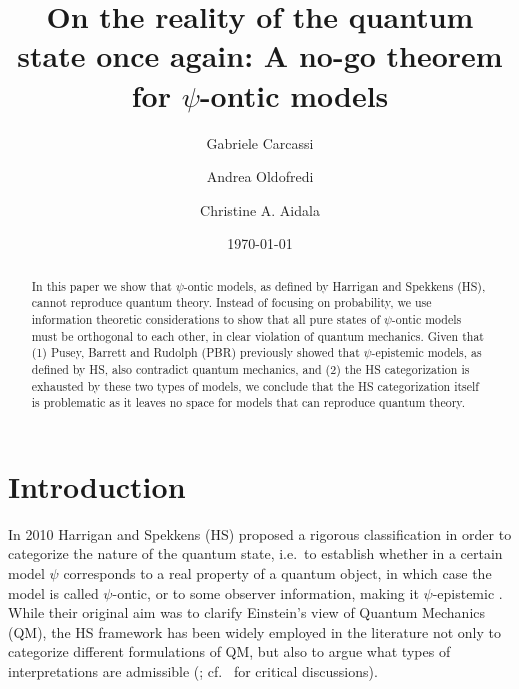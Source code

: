 \documentclass[10pt,twocolumn, nofootinbib]{revtex4-2}
\begin{document}
\title{On the reality of the quantum state once again: A no-go theorem for $\psi$-ontic models}
\author{Gabriele Carcassi}
\author{Andrea Oldofredi}
\author{Christine A. Aidala}
\vspace{2mm}

\date{\today}


\begin{abstract}
	In this paper we show that $\psi$-ontic models, as defined by Harrigan and Spekkens (HS), cannot reproduce quantum theory. Instead of focusing on probability, we use information theoretic considerations to show that all pure states of $\psi$-ontic models must be orthogonal to each other, in clear violation of quantum mechanics. Given that  (1) Pusey, Barrett and Rudolph (PBR) previously showed that $\psi$-epistemic models, as defined by HS, also contradict quantum mechanics, and (2) the HS categorization is exhausted by these two types of models, we conclude that the HS categorization itself is problematic as it leaves no space for models that can reproduce quantum theory.
\end{abstract}

\maketitle

\section{Introduction}
 
In 2010 Harrigan and Spekkens (HS) proposed a rigorous classification in order to categorize the nature of the quantum state, i.e.\ to establish whether in a certain model $\psi$ corresponds to a real property of a quantum object, in which case the model is called $\psi$-ontic, or to some observer information, making it $\psi$-epistemic \cite{Harrigan:2010}. While their original aim was to clarify Einstein's view of Quantum Mechanics (QM), the HS framework has been widely employed in the literature not only to categorize different formulations of QM, but also to argue what types of interpretations are admissible (\cite{Leifer:2013, Leifer:2017, Branciard:2014, Hermens:2021, Wood:2015, Ringbauer:2015, Mazurek:2016, Bartlett:2012}; cf.\ \cite{Oldofredi:2020b, Ladyman:2021} for critical discussions). 
\end{document}
